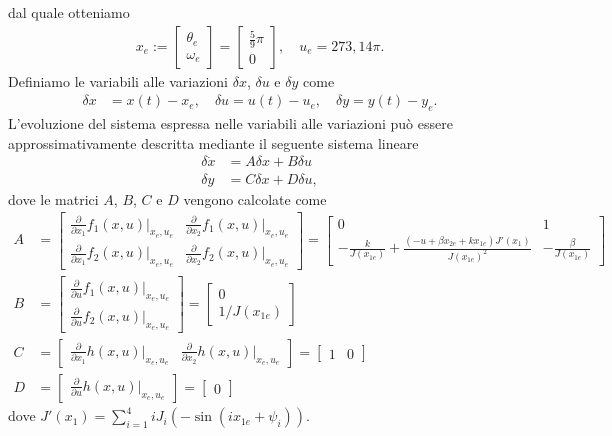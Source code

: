 \documentclass[a4paper, 11pt]{article}
\begin{document}
%
dal quale otteniamo
%
\begin{align}
	x_e := \begin{bmatrix}
		\theta_e \\
		\omega_e
	\end{bmatrix} = \begin{bmatrix}
		\frac{5}{9}\pi \\
		0
	\end{bmatrix},  \quad u_e = 273,14 \pi.\label{eq:equilibirum_pair}
\end{align}
%
Definiamo le variabili alle variazioni $\delta x$, $\delta u$ e $\delta y$ come 
%
\begin{align*}
	\delta x &= x(t) - x_e, 
	\quad
	\delta u = u(t) - u_e, 
	\quad
	\delta y = y(t) - y_e.
\end{align*}
%
L'evoluzione del sistema espressa nelle variabili alle variazioni pu\`o essere approssimativamente descritta mediante il seguente sistema lineare
%
\begin{subequations}\label{eq:linearized_system}
\begin{align}
	\delta \dot{x} &= A\delta x + B\delta u
	\\
	\delta y &= C\delta x + D\delta u,
\end{align}
\end{subequations}
%
dove le matrici $A$, $B$, $C$ e $D$ vengono calcolate come
%
\newcommand{\pdv}[2]{\frac{\partial}{\partial #1}#2(x,u)|_{x_e,u_e}}
\begin{subequations}\label{eq:matrices}
\begin{align}
	A &=\begin{bmatrix}
		\pdv{x_1}{f_1} & \pdv{x_2}{f_1} \\
		\pdv{x_1}{f_2} & \pdv{x_2}{f_2}
	\end{bmatrix} = \begin{bmatrix}
		0 & 1 \\
		-\frac{k}{J(x_{1e})} + \frac{(-u+\beta x_{2e}+kx_{1e})J'(x_1)}{J(x_{1e})^2} & -\frac{\beta}{J(x_{1e})}
	\end{bmatrix}
	\\
	B &=\begin{bmatrix}
		\pdv{u}{f_1} \\
		\pdv{u}{f_2}
	\end{bmatrix} = \begin{bmatrix}
		0 \\
		1/J(x_{1e})
	\end{bmatrix}
	\\
	C &=\begin{bmatrix}
		\pdv{x_1}{h} & \pdv{x_2}{h}
	\end{bmatrix} = \begin{bmatrix}
		1 & 0
	\end{bmatrix}
	\\
	D &= \begin{bmatrix}
		\pdv{u}{h}
	\end{bmatrix} = \begin{bmatrix}
		0
	\end{bmatrix}
\end{align}
\end{subequations}
dove $J'(x_1)=\sum_{i=1}^{4}iJ_i(-\sin(ix_{1e}+\psi_i))$.
\end{document}
